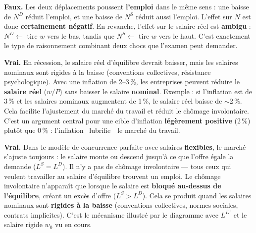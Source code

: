 
\begin{reponse}
\textbf{Faux.} Les deux déplacements poussent \textbf{l'emploi} dans le même sens : une baisse de $N^D$ réduit l'emploi, et une baisse de $N^S$ réduit aussi l'emploi. L'effet sur $N$ est donc \textbf{certainement négatif}. En revanche, l'effet sur le salaire réel est \textbf{ambigu} : $N^D \leftarrow$ tire $w$ vers le bas, tandis que $N^S \leftarrow$ tire $w$ vers le haut. C'est exactement le type de raisonnement combinant deux chocs que l'examen peut demander.
\end{reponse}



\begin{reponse}
\textbf{Vrai.} En récession, le salaire réel d'équilibre devrait baisser, mais les salaires nominaux sont rigides à la baisse (conventions collectives, résistance psychologique). Avec une inflation de 2--3\,\%, les entreprises peuvent réduire le \textbf{salaire réel} ($w/P$) sans baisser le salaire \textbf{nominal}. Exemple : si l'inflation est de 3\,\% et les salaires nominaux augmentent de 1\,\%, le salaire réel baisse de $\sim$2\,\%. Cela facilite l'ajustement du marché du travail et réduit le chômage involontaire. C'est un argument central pour une cible d'inflation \textbf{légèrement positive} (2\,\%) plutôt que 0\,\% : l'inflation \guillemotleft~lubrifie~\guillemotright\ le marché du travail.
\end{reponse}


\begin{reponse}
\textbf{Vrai.} Dans le modèle de concurrence parfaite avec salaires \textbf{flexibles}, le marché s'ajuste toujours : le salaire monte ou descend jusqu'à ce que l'offre égale la demande ($L^S = L^D$). Il n'y a pas de chômage involontaire --- tous ceux qui veulent travailler au salaire d'équilibre trouvent un emploi. Le chômage involontaire n'apparaît que lorsque le salaire est \textbf{bloqué au-dessus de l'équilibre}, créant un excès d'offre ($L^S > L^D$). Cela se produit quand les salaires nominaux sont \textbf{rigides à la baisse} (conventions collectives, normes sociales, contrats implicites). C'est le mécanisme illustré par le diagramme avec $L^{D\prime}$ et le salaire rigide $w_0$ vu en cours.
\end{reponse}

